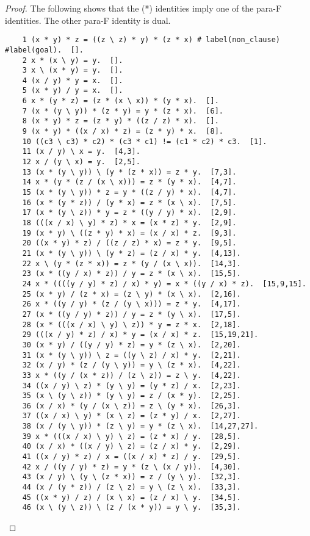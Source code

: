 \documentclass[12pt, twoside, openright]{report}
\theoremstyle{definition}
\begin{document}
\begin{proof}\label{appendix:can1}
  The following shows that the (*) identities imply one of the para-F identities. The other para-F identity is dual.
  \begin{lstlisting}
    1 (x * y) * z = ((z \ z) * y) * (z * x) # label(non_clause) #label(goal).  [].
  	2 x * (x \ y) = y.  [].
  	3 x \ (x * y) = y.  [].
  	4 (x / y) * y = x.  [].
  	5 (x * y) / y = x.  [].
  	6 x * (y * z) = (z * (x \ x)) * (y * x).  [].
  	7 (x * (y \ y)) * (z * y) = y * (z * x).  [6].
  	8 (x * y) * z = (z * y) * ((z / z) * x).  [].
  	9 (x * y) * ((x / x) * z) = (z * y) * x.  [8].
  	10 ((c3 \ c3) * c2) * (c3 * c1) != (c1 * c2) * c3.  [1].
  	11 (x / y) \ x = y.  [4,3].
  	12 x / (y \ x) = y.  [2,5].
  	13 (x * (y \ y)) \ (y * (z * x)) = z * y.  [7,3].
  	14 x * (y * (z / (x \ x))) = z * (y * x).  [4,7].
  	15 (x * (y \ y)) * z = y * ((z / y) * x).  [4,7].
  	16 (x * (y * z)) / (y * x) = z * (x \ x).  [7,5].
  	17 (x * (y \ z)) * y = z * ((y / y) * x).  [2,9].
  	18 (((x / x) \ y) * z) * x = (x * z) * y.  [2,9].
  	19 (x * y) \ ((z * y) * x) = (x / x) * z.  [9,3].
  	20 ((x * y) * z) / ((z / z) * x) = z * y.  [9,5].
  	21 (x * (y \ y)) \ (y * z) = (z / x) * y.  [4,13].
  	22 x \ (y * (z * x)) = z * (y / (x \ x)).  [14,3].
  	23 (x * ((y / x) * z)) / y = z * (x \ x).  [15,5].
  	24 x * ((((y / y) * z) / x) * y) = x * ((y / x) * z).  [15,9,15].
  	25 (x * y) / (z * x) = (z \ y) * (x \ x).  [2,16].
  	26 x * ((y / y) * (z / (y \ x))) = z * y.  [4,17].
  	27 (x * ((y / y) * z)) / y = z * (y \ x).  [17,5].
  	28 (x * (((x / x) \ y) \ z)) * y = z * x.  [2,18].
  	29 (((x / y) * z) / x) * y = (x / x) * z.  [15,19,21].
  	30 (x * y) / ((y / y) * z) = y * (z \ x).  [2,20].
  	31 (x * (y \ y)) \ z = ((y \ z) / x) * y.  [2,21].
  	32 (x / y) * (z / (y \ y)) = y \ (z * x).  [4,22].
  	33 x * ((y / (x * z)) / (z \ z)) = z \ y.  [4,22].
  	34 ((x / y) \ z) * (y \ y) = (y * z) / x.  [2,23].
  	35 (x \ (y \ z)) * (y \ y) = z / (x * y).  [2,25].
  	36 (x / x) * (y / (x \ z)) = z \ (y * x).  [26,3].
  	37 ((x / x) \ y) * (x \ z) = (z * y) / x.  [2,27].
  	38 (x / (y \ y)) * (z \ y) = y * (z \ x).  [14,27,27].
  	39 x * (((x / x) \ y) \ z) = (z * x) / y.  [28,5].
  	40 (x / x) * ((x / y) \ z) = (z / x) * y.  [2,29].
  	41 ((x / y) * z) / x = ((x / x) * z) / y.  [29,5].
  	42 x / ((y / y) * z) = y * (z \ (x / y)).  [4,30].
  	43 (x / y) \ (y \ (z * x)) = z / (y \ y).  [32,3].
  	44 (x / (y * z)) / (z \ z) = y \ (z \ x).  [33,3].
  	45 ((x * y) / z) / (x \ x) = (z / x) \ y.  [34,5].
  	46 (x \ (y \ z)) \ (z / (x * y)) = y \ y.  [35,3].

\end{lstlisting}
\end{proof}
\end{document}

